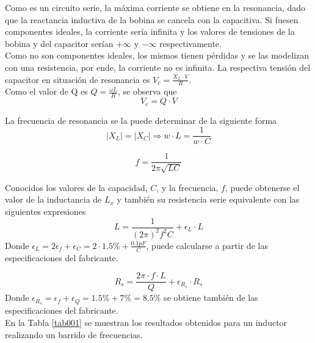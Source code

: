 \documentclass[a4paper,10pt]{article}
\begin{document}
		\indent Como es un circuito serie, la máxima corriente se obtiene en 
		la resonancia, dado que la reactancia inductiva de la bobina se 
		cancela con la capacitiva. Si fuesen componentes ideales, la corriente
		sería infinita y los valores de tensiones de la bobina y del capacitor
		serían $+\infty$ y $-\infty$ respectivamente. \\
		\indent Como no son componentes ideales, los mismos tienen pérdidas y
		se las modelizan con una resistencia, por ende, la corriente no es 
		infinita. La respectiva tensión del capacitor en situación de 
		resonancia es $V_c = \frac{X_L\cdot V}{R}$. \\
		\indent Como el valor de Q es $Q=\frac{\omega L}{R}$, se observa que 
		$$V_c = Q \cdot V$$

		\indent La frecuencia de resonancia se la puede determinar de la 
		siguiente forma
		$$|X_L|=|X_C| \Rightarrow w\cdot L = \frac{1}{w\cdot C}$$

		$$f=\frac{1}{2\pi\sqrt{LC}}$$ 
		
		\indent Conocidos los valores de la capacidad, $C$, y la frecuencia, 
		$f$, puede obtenerse el valor de la inductancia de $L_x$ y tambi\'en 
		su resistencia serie equivalente con las siguientes expresiones
		$$L=\frac{1}{(2\pi)^2 f^2C}+\epsilon_L\cdot L$$
		Donde $\epsilon_L=2\epsilon_f+\epsilon_C=2\cdot 1.5\%+\frac{0.1pF}{C}$, puede calcularse a partir de las especificaciones del  fabricante.
		
		$$R_s=\frac{2\pi\cdot f\cdot L}{Q}+\epsilon_{R_s}\cdot R_s$$
		Donde $\epsilon_{R_s}=\epsilon_f+\epsilon_Q= 1.5\%+ 7\%=8.5\%$ se obtiene tambi\'en de las especificaciones del fabricante.
		\\
		\indent En la Tabla \ref{tab001} se muestran los resultados obtenidos
		para un inductor realizando un barrido de frecuencias.
		
\end{document}
